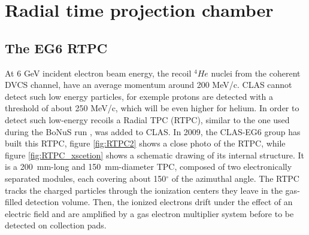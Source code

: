 \chapter{Radial time projection chamber}


\section{The EG6 RTPC}

At 6 GeV incident electron beam energy, the recoil $^{4}He$ nuclei from 
the coherent DVCS channel, have an average momentum around 200 MeV/c. CLAS 
cannot detect such low energy particles, for exemple protons are detected with 
a threshold of about 250 MeV/c, which will be even higher for helium. In order 
to detect such low-energy recoils a Radial TPC (RTPC), similar to the one used 
during the BoNuS run \cite{BONUS}, was added to CLAS. In 2009, the CLAS-EG6 
group \cite{proposal} has built this RTPC, figure \ref{fig:RTPC2} shows a 
close photo of the RTPC, while figure \ref{fig:RTPC_xscetion} shows a 
schematic drawing of its internal structure. It is a 200~mm-long and 
150~mm-diameter TPC, composed of two electronically separated modules, each 
covering about 150$^{\circ}$ of the azimuthal angle. The RTPC tracks the 
charged particles through the ionization centers they leave in the gas-filled 
detection volume. Then, the ionized electrons drift under the effect of an 
electric field and are amplified by a gas electron multiplier system before to 
be detected on collection pads.


